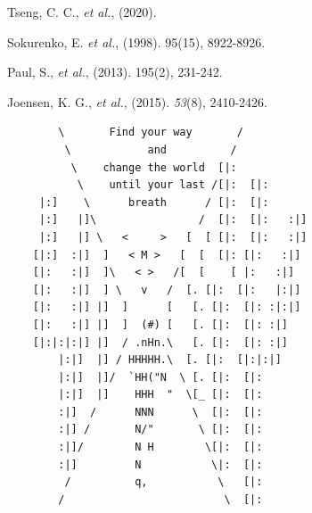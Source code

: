 \documentclass[
]{article}
\begin{document}
Tseng, C. C., \emph{et al.}, (2020).

Sokurenko, E. \emph{et al.}, (1998). 95(15), 8922-8926.

Paul, S., \emph{et al.}, (2013). 195(2), 231-242.

Joensen, K. G., \emph{et al.}, (2015). \emph{53}(8), 2410-2426.

\begin{verbatim}
        \       Find your way       /
         \            and          /   
          \    change the world  [|:  
           \    until your last /[|:  [|:
     |:]    \      breath      / [|:  [|:
     |:]   |]\                /  [|:  [|:   :|]
     |:]   |] \   <     >   [  [ [|:  [|:   :|]
    [|:]  :|]  ]   < M >   [  [  [|: [|:   :|]
    [|:   :|]  ]\   < >   /[  [    [ |:   :|]  
    [|:   :|]  ] \   v   /  [. [|:  [|:   |:|]
    [|:   :|] |]  ]      [   [. [|:  [|: :|:|]
    [|:   :|] |]  ]  (#) [   [. [|:  [|: :|]
    [|:|:|:|] |]  / .nHn.\   [. [|:  [|: :|]
        |:|]  |] / HHHHH.\  [. [|:  [|:|:|]
        |:|]  |]/  `HH("N  \ [. [|:  [|:
        |:|]  |]    HHH  "  \[_ [|:  [|:
        :|]  /      NNN      \  [|:  [|:  
        :|] /       N/"       \ [|:  [|:  
        :|]/        N H        \[|:  [|:
        :|]         N           \|:  [|:
         /          q,           \   [|:
        /                         \  [|:
\end{verbatim}
\end{document}
